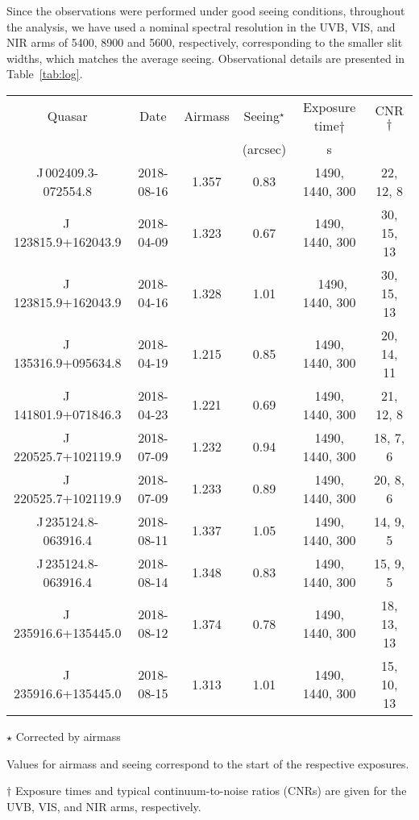 \documentclass[fleqn,usenatbib,useAMS]{mnras}
\begin{document}
Since the observations were performed under good seeing conditions, throughout the analysis, we have used a nominal spectral resolution in the UVB, VIS, and NIR arms of 5400, 8900 and 5600, respectively, corresponding to the smaller slit widths, which matches the average seeing.
Observational details are presented in Table~\ref{tab:log}.


\begin{table*}
\centering
\caption{Log of X-shooter observations}
\label{tab:log}
\addtolength{\tabcolsep}{-2pt}
\begin{tabular}{cccccc}
\hline %
Quasar & Date  &  Airmass   & Seeing$^\star$  & Exposure time$\dagger$  &CNR$\dagger$ \\ 
       &                     &        & (arcsec) &s&\\
\hline
J\,002409.3-072554.8  & 2018-08-16 &  1.357 & 0.83 &1490, 1440, 300 & 22, 12, 8\\
\hline
J\,123815.9+162043.9 & 2018-04-09 &1.323 & 0.67& 1490, 1440, 300 &  30, 15, 13\\ 
J\,123815.9+162043.9 & 2018-04-16 &  1.328 & 1.01 & \ 1490, 1440, 300 & 30, 15, 13\\
\hline
J\,135316.9+095634.8 & 2018-04-19 &   1.215 & 0.85 & 1490, 1440, 300 & 20, 14, 11\\
\hline
J\,141801.9+071846.3 & 2018-04-23 &   1.221 & 0.69 & 1490, 1440, 300 & 21, 12, 8\\
\hline
J\,220525.7+102119.9 & 2018-07-09 &  1.232 & 0.94 & 1490, 1440, 300 & 18, 7, 6 \\
J\,220525.7+102119.9 & 2018-07-09 &  1.233 & 0.89 & 1490, 1440, 300 & 20, 8, 6 \\
\hline
J\,235124.8-063916.4 & 2018-08-11 &  1.337 & 1.05 & 1490, 1440, 300 & 14, 9, 5\\
J\,235124.8-063916.4 & 2018-08-14 & 1.348 & 0.83 & 1490, 1440, 300 & 15, 9, 5\\
\hline
J\,235916.6+135445.0 & 2018-08-12 &  1.374 & 0.78 & 1490, 1440, 300 & 18, 13, 13\\
J\,235916.6+135445.0 & 2018-08-15 &  1.313 & 1.01 & 1490, 1440, 300 & 15, 10, 13\\
\hline %
\end{tabular}
\addtolength{\tabcolsep}{2pt}
\begin{tablenotes}
\item $\star$ Corrected by airmass
\item Values for airmass and seeing correspond to the start of the respective exposures. 
\item $\dagger$ Exposure times and typical continuum-to-noise ratios (CNRs) are given for the UVB, VIS, and NIR arms, respectively.
\end{tablenotes}
\end{table*}
\end{document}
